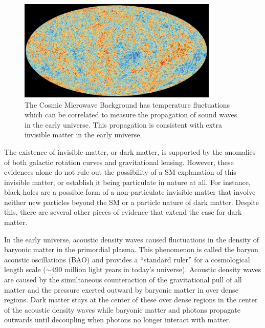\begin{figure}
    \centering
    \includegraphics[width=0.85\textwidth]{figs/motivation/cmb.jpg}
    \caption{The Cosmic Microwave Background has temperature fluctuations which can be correlated to measure the propagation of sound waves in the early universe. This propagation is consistent with extra invisible matter in the early universe.}
    \label{fig:dm}
\end{figure}

The existence of invisible matter, or dark matter, is supported by the anomalies of both galactic rotation curves and gravitational lensing. However, these evidences alone do not rule out the possibility of a SM explanation of this invisible matter, or establish it being particulate in nature at all. For instance, black holes are a possible form of a non-particulate invisible matter that involve neither new particles beyond the SM or a particle nature of dark matter. Despite this, there are several other pieces of evidence that extend the case for dark matter.

In the early universe, acoustic density waves caused fluctuations in the density of baryonic matter in the primordial plasma. This phenomenon is called the baryon acoustic oscillations (BAO) and provides a ``standard ruler'' for a cosmological length scale ($\sim$490 million light years in today's universe). Acoustic density waves are caused by the simultaneous counteraction of the gravitational pull of all matter and the pressure exerted outward by baryonic matter in over dense regions. Dark matter stays at the center of these over dense regions in the center of the acoustic density waves while baryonic matter and photons propagate outwards until decoupling when photons no longer interact with matter. 


